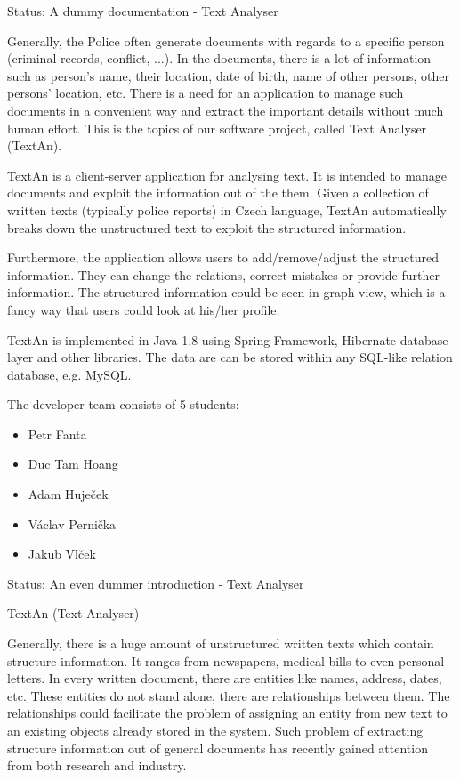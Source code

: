 Status: A dummy documentation - Text Analyser

Generally, the Police often generate documents with regards to a specific person (criminal records, conflict, ...). 
In the documents, there is a lot of information such as
person's name, their location, date of birth, name of other persons, other persons' location, etc.
There is a need for an application to manage such documents in a convenient way and extract the important details without much human effort.
This is the topics of our software project, called Text Analyser (TextAn).

TextAn is a client-server application for analysing text.
It is intended to manage documents and exploit the information out of the them.
Given a collection of written texts (typically police reports) in Czech language,
TextAn automatically breaks down the unstructured text to exploit the structured information. 

Furthermore, the application allows users to add/remove/adjust the structured information.
They can change the relations, correct mistakes or provide further information.
The structured information could be seen in graph-view,
which is a fancy way that users could look at his/her profile. 

TextAn is implemented in Java 1.8 using Spring Framework, Hibernate database layer and other libraries.
The data are can be stored within any SQL-like relation database, e.g. MySQL.

The developer team consists of 5 students:

\begin{itemize}
\itemsep0em
\item Petr Fanta
\item Duc Tam Hoang
\item Adam Huječek
\item Václav Pernička
\item Jakub Vlček
\end{itemize}

Status: An even dummer introduction - Text Analyser

TextAn (Text Analyser)

Generally, there is a huge amount of unstructured written texts which contain structure information.
It ranges from newspapers, medical bills to even personal letters.
In every written document, there are entities like names, address, dates, etc.
These entities do not stand alone, there are relationships between them.
The relationships could facilitate the problem of assigning an entity from new text to an existing objects already stored in the system.
Such problem of extracting structure information out of general documents has recently gained attention from both research and industry.

